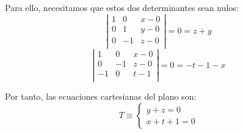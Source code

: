 \begin{ejercicio}
\begin{enumerate}
        Para ello, necesitamos que estos dos determinantes sean nulos:
        \begin{equation*}
            \left|\begin{array}{ccc}
                1 & 0 & x-0 \\
                0 & 1 & y-0 \\
                0 & -1 & z-0 \\
            \end{array}\right| = 0 = z+y
        \end{equation*}
        \begin{equation*}
            \left|\begin{array}{ccc}
                1 & 0 & x-0 \\
                0 & -1 & z-0 \\
                -1 & 0 & t-1 \\
            \end{array}\right| = 0 = -t-1-x
        \end{equation*}

        Por tanto, las ecuaciones cartesianas del plano son:
        \begin{equation*}
            T\equiv \left\{\begin{array}{l}
                y+z=0\\
                x+t+1 = 0
            \end{array}\right.
        \end{equation*}
    \end{enumerate}
\end{ejercicio}


